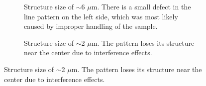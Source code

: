  \begin{figure}[htb]
     \centering
     \begin{subfigure}[t]{0.32\linewidth}
  	\centering
  	\caption{Structure size of $\sim$6 $\mu$m. There is a small defect in the line pattern on the left side, which was most likely caused by improper handling of the sample.}
  	\label{fig:b2d1_q1}
  \end{subfigure}
 \hfill
     \begin{subfigure}[t]{0.32\linewidth}
  	\centering
  	\caption{Structure size of $\sim$2 $\mu$m. The pattern loses its structure near the center due to interference effects.}

\end{subfigure}
\end{figure}
